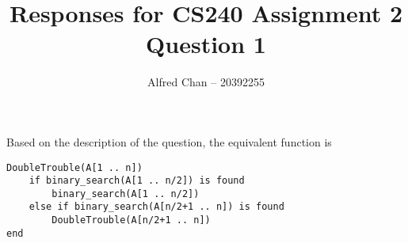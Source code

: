 \documentclass[12pt]{article}
\title{Responses for CS240 Assignment 2 Question 1}
\author{Alfred Chan -- 20392255}
\begin{document}
\lstset{
	language=bash,
	numbers=left,
	showspaces=false,
	showstringspaces=false,
	stepnumber=1,
	basicstyle=\ttfamily,
	frame=single,
	breaklines=true,
	tabsize=2
}

Based on the description of the question, the equivalent function is
\begin{lstlisting}
DoubleTrouble(A[1 .. n])
	if binary_search(A[1 .. n/2]) is found
		binary_search(A[1 .. n/2])
	else if binary_search(A[n/2+1 .. n]) is found
		DoubleTrouble(A[n/2+1 .. n])
end
\end{lstlisting}
\end{document}
